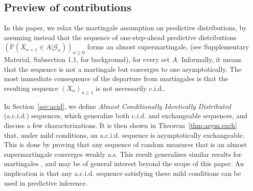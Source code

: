 \documentclass{article}
\theoremstyle{definition}
\renewcommand{\&}{and}
\begin{document}

\subsection{Preview of contributions}

In this paper, %
we relax the martingale assumption on predictive distributions, by assuming instead that  the sequence of one-step-ahead predictive distributions $(\mathbb{P}(X_{n+1} \in A |\mathcal{G}_n))_{n \geq 0}$ forms an almost supermartingale, \citep{robbins1971convergence} (see Supplementary Material, Subsection 1.1, %
for background), for every set $A$. %
Informally, it means that the sequence is not a martingale but converges to one asymptotically. %
The most immediate consequence of the departure from martingales is that the resulting sequence $(X_n)_{n \geq 1}$ is not necessarily c.i.d..

In Section~\ref{sec:acid}, we define \textit{Almost Conditionally Identically Distributed} (a.c.i.d.) sequences, which generalize both c.i.d. and exchangeable sequences, and discuss a few characterizations. %
It is then shown in Theorem~\ref{thm:asym.exch} that, under mild conditions,  an a.c.i.d. sequence is asymptotically exchangeable. This is done by proving that any sequence of random measures that is an almost supermartingale converges weakly a.s. This result generalizes similar results for martingales \citep[e.g.][]{ald85}, and may be of general interest beyond the scope of this paper.  An implication is that any a.c.i.d. sequence satisfying these mild conditions can be used in predictive inference.%
   
\end{document}
